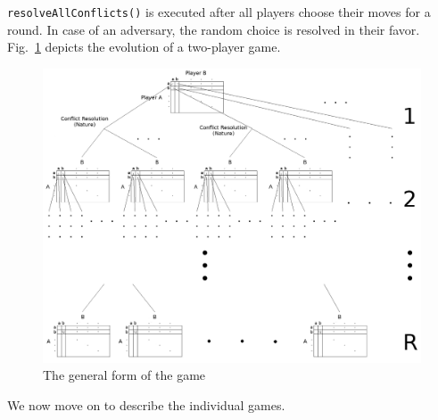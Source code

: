  \noindent \texttt{resolveAllConflicts()} is executed after all players choose their moves for a round. In case of an
  adversary, the random choice is resolved in their favor. Fig.~\ref{fig:game} depicts the evolution of a two-player game.

  \begin{figure}[h]
  \label{fig:game}
    \centering
    \includegraphics[width=\textwidth]{game}
    \caption{The general form of the game \cite{sgtm}}
  \end{figure}
  
  \noindent We now move on to describe the individual games.
